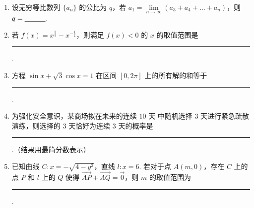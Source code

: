 \begin{description}
\begin{enumerate}[leftmargin=5pt]
        \item 设无穷等比数列 \(\{a_{n}\}\) 的公比为 \(q\)，若 \(a_{1} = \lim\limits_{n\to \infty}(a_{3} + a_{4} + \dots + a_{n})\)，则 \(q =\rule[-0.3ex]{3em}{0.4pt}\).

        \item 若 \( f(x) = x^{\frac{2}{3}} - x^{-\frac{1}{2}} \)，则满足 \( f(x) < 0 \) 的 \( x \) 的取值范围是\rule[-0.3ex]{3em}{0.4pt}.

        \item 方程 \(\sin x + \sqrt{3}\cos x = 1\) 在区间 \([0, 2\pi]\) 上的所有解的和等于\rule[-0.3ex]{3em}{0.4pt}.

        \item 为强化安全意识，某商场拟在未来的连续 \(10\text{ 天}\) 中随机选择 \(3\text{ 天}\)进行紧急疏散演练，则选择的 \(3\text{ 天}\)恰好为连续 \(3\text{ 天}\)的概率是\rule[-0.3ex]{3em}{0.4pt}.（结果用最简分数表示）

        \item 已知曲线 \(C: x = -\sqrt{4 - y^2}\)，直线 \(l: x = 6\). 若对于点 \(A(m,0)\)，存在 \(C\) 上的点 \(P\) 和 \(l\) 上的 \(Q\) 使得 \(\overrightarrow{AP} + \overrightarrow{AQ} = \overrightarrow{0}\)，则 \(m\) 的取值范围为\rule[-0.3ex]{3em}{0.4pt}.

    \end{enumerate}

\end{description}

